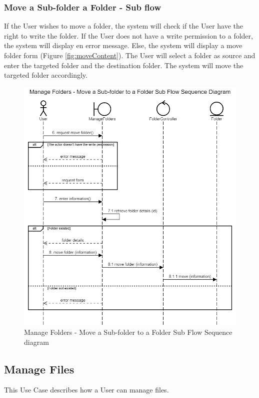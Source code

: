 \subsubsection{Move a Sub-folder a Folder - Sub flow}
If the User wishes to move a folder, the system will check if the User have the right to write the folder. If the User does not have a write permission to a folder, the system will display en error message. Else, the system will display a move folder form (Figure \ref{fig:moveContent}). The User will select a folder as source and enter the targeted folder and the destination folder. The system will move the targeted folder accordingly.  
\begin{figure}[H]
    \centering
    \includegraphics[width=1.0\textwidth]{images/Manage Folders - Move a Sub-folder to a Folder Sub Flow Sequence Diagram.png}
    \caption{Manage Folders - Move a Sub-folder to a Folder Sub Flow Sequence diagram}
    \label{fig:SeqFoldersMove}
\end{figure}

\subsection{Manage Files}
This Use Case describes how a User can manage files.
